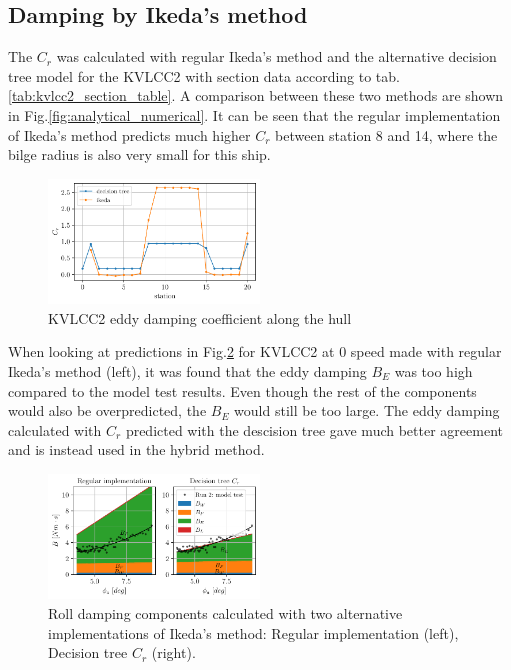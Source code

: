     \subsection*{Damping by Ikeda's method}\label{damping-by-ikedas-method}

    The $C_r$ was calculated with regular Ikeda's method and the
alternative decision tree model for the KVLCC2 with section data
according to tab.\ref{tab:kvlcc2_section_table}. A comparison
between these two methods are shown in
Fig.\ref{fig:analytical_numerical}. It can be seen that the
regular implementation of Ikeda's method predicts much higher $C_r$
between station 8 and 14, where the bilge radius is also very small for
this ship.

    

    \begin{figure}[H]
        \begin{center}\includegraphics[width = 0.5\textwidth]{figures/kvlcc2_eddy.pdf}\end{center}
        \vspace{-1cm}
        \caption{KVLCC2 eddy damping coefficient along the hull}
        \label{fig:kvlcc2_eddy}
    \end{figure}
    
    When looking at predictions in Fig.\ref{fig:ikeda} for KVLCC2 at
0 speed made with regular Ikeda's method (left), it was found that the
eddy damping $B_E$ was too high compared to the model test results.
Even though the rest of the components would also be overpredicted, the
$B_E$ would still be too large. The eddy damping calculated with
$C_r$ predicted with the descision tree gave much better agreement and
is instead used in the hybrid method.

    

    \begin{figure}[H]
        \begin{center}\includegraphics[width = 0.5\textwidth]{figures/ikeda.pdf}\end{center}
        \vspace{-1cm}
        \caption{Roll damping components calculated with two alternative implementations of Ikeda's method: Regular implementation (left), Decision tree $C_r$ (right).}
        \label{fig:ikeda}
    \end{figure}
    
